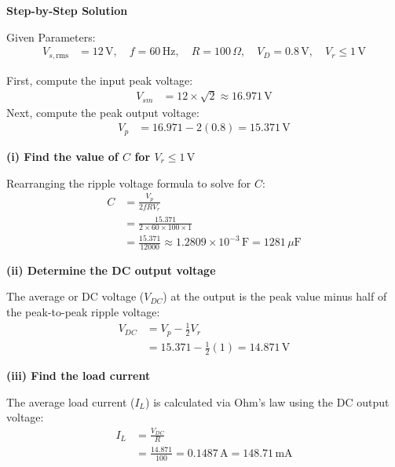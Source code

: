 \documentclass[12pt,a3paper]{article}
\begin{document}
\begin{enumerate}
\begin{tcolorbox}[enhanced,breakable,ansbox,colback=cA!4,colframe=cA,boxrule=0.8pt,arc=5pt,title={\textbf{Answer}},fonttitle=\bfseries\color{white},colbacktitle=cA]
\vspace{0.5cm}

\textbf{Step-by-Step Solution}

Given Parameters:
\begin{align*}
    V_{s,\text{rms}} &= 12\,\text{V}, \quad f = 60\,\text{Hz}, \quad R = 100\,\Omega, \quad V_D = 0.8\,\text{V}, \quad V_r \le 1\,\text{V}
\end{align*}

First, compute the input peak voltage:
\begin{align}
    V_{sm} &= 12 \times \sqrt{2} \approx 16.971\,\text{V}
\end{align}
Next, compute the peak output voltage:
\begin{align}
    V_p &= 16.971 - 2(0.8) = 15.371\,\text{V}
\end{align}

\vspace{0.3cm}

\textbf{(i) Find the value of $C$ for $V_r \le 1\,\text{V}$}

Rearranging the ripple voltage formula to solve for $C$:
\begin{align}
    C &= \frac{V_p}{2fR V_r} \nonumber \\
    &= \frac{15.371}{2 \times 60 \times 100 \times 1} \nonumber \\
    &= \frac{15.371}{12000} \approx 1.2809 \times 10^{-3}\,\text{F} = 1281\,\mu\text{F}
\end{align}

\vspace{0.3cm}

\textbf{(ii) Determine the DC output voltage}

The average or DC voltage ($V_{DC}$) at the output is the peak value minus half of the peak-to-peak ripple voltage:
\begin{align}
    V_{DC} &= V_p - \frac{1}{2}V_r \nonumber \\
    &= 15.371 - \frac{1}{2}(1) = 14.871\,\text{V}
\end{align}

\vspace{0.3cm}

\textbf{(iii) Find the load current}

The average load current ($I_L$) is calculated via Ohm's law using the DC output voltage:
\begin{align}
    I_L &= \frac{V_{DC}}{R} \nonumber \\
    &= \frac{14.871}{100} = 0.1487\,\text{A} = 148.71\,\text{mA}
\end{align}


\end{tcolorbox}
\end{enumerate}
\end{document}
